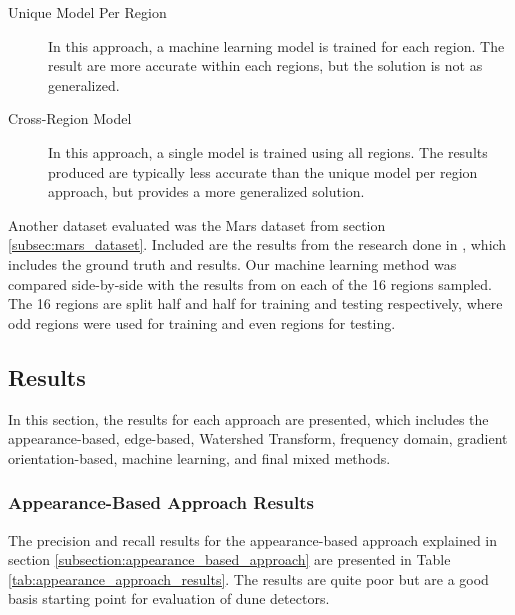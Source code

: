 \begin{description}
	\item[Unique Model Per Region] In this approach, a machine learning model is trained for each region. The result are more accurate within each regions, but the solution is not as generalized. 
	\item[Cross-Region Model] In this approach, a single model is trained using all regions. The results produced are typically less accurate than the unique model per region approach, but provides a more generalized solution.
\end{description}

Another dataset evaluated was the Mars dataset from section \ref{subsec:mars_dataset}. Included are the results from the research done in \cite{vaz_object_based_dune_analysis}, which includes the ground truth and results. Our machine learning method was compared side-by-side with the results from \cite{vaz_object_based_dune_analysis} on each of the 16 regions sampled. The 16 regions are split half and half for training and testing respectively, where odd regions were used for training and even regions for testing. 

\subsection{Results} \label{subsec:results-and-discussion}

In this section, the results for each approach are presented, which includes the appearance-based, edge-based, Watershed Transform, frequency domain, gradient orientation-based, machine learning, and final mixed methods.

\subsubsection*{Appearance-Based Approach Results}

The precision and recall results for the appearance-based approach explained in section \ref{subsection:appearance_based_approach} are presented in Table \ref{tab:appearance_approach_results}. The results are quite poor but are a good basis starting point for evaluation of dune detectors. 

